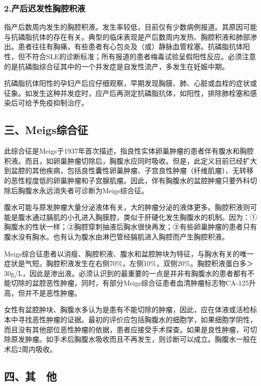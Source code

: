\subsubsection{2.产后迟发性胸腔积液}

指产后数周内发生的胸腔积液。发生率较低，目前仅有少数病例报道。其原因可能与抗磷脂抗体的存在有关。典型的临床表现是产后数周内发热、胸腔积液和肺部渗出。患者往往有胸痛，有些患者有心包炎及（或）静脉血管栓塞。抗磷脂抗体阳性，但不符合SLE的诊断标准；所有报道的患者梅毒试验呈假阳性反应。必须注意的是抗磷脂综合征其中的一个并发症是自发性流产，多发生在妊娠中期。

抗磷脂抗体阳性的孕妇产后应仔细观察，早期发现胸膜、肺、心脏或血栓的症状或征象。如发生这种并发症时，应产后再测定抗磷脂抗体，如阳性，排除肺栓塞和感染后可给予免疫抑制治疗。

\subsection{三、Meigs综合征}

此综合征是Meigs于1937年首次描述，指良性实体卵巢肿瘤的患者伴有腹水和胸腔积液。而且，如卵巢肿瘤切除后，胸腹水应同时吸收。但是，此定义目前已经扩大到盆腔的其他疾病，包括良性囊性卵巢肿瘤、子宫良性肿瘤（纤维肌瘤）、无转移的恶性程度低的卵巢肿瘤和子宫腺肌瘤。因此，伴有胸腹水的盆腔肿瘤只要外科切除后胸腹水永远消失者可诊断为Meigs综合征。

腹水可能与原发肿瘤大量分泌液体有关，大的肿瘤分泌的液体更多。胸腔积液则可能是腹水通过膈肌的小孔进入胸膜腔，类似于肝硬化发生胸腹水的机制。因为：①胸腹水的性状一样；②胸腔穿刺抽液后胸水很快再发；③有些卵巢肿瘤的患者只有腹水没有胸水。也有认为腹水由淋巴管经膈肌进入胸腔而产生胸腔积液。

Meigs综合征患者以消瘦、胸腔积液、腹水和盆腔肿块为特征，与胸水有关的唯一症状是气短。胸腔积液发生在右侧70\%，左侧10\%，双侧20\%。胸腔积液蛋白多＞30g/L，因此是渗出液。必须认识到的最重要的一点是并非有胸腹水的患者都有不能切除的盆腔恶性肿瘤，同时，有部分Meigs综合征患者血清肿瘤标志物CA-125升高，但并不是恶性肿瘤。

女性有盆腔肿块、胸腹水多认为是患有不能切除的肿瘤，因此，应在体液或活检标本中寻找恶性肿瘤的证据。最初的评价应包括胸腹水的细胞学，如果细胞学阴性，而且没有其他部位恶性肿瘤的依据，患者应接受手术探查。如果是良性肿瘤，可切除原发肿瘤。如手术后胸腹水吸收而且不再发生，则诊断可以成立。胸腹水一般在术后2周内吸收。

\subsection{四、其　他}


